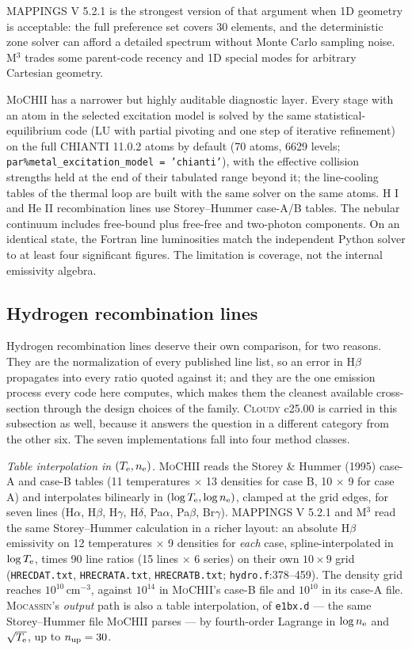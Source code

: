 \documentclass[english,a4paper]{my_memo}
\newcommand{\code}[1]{\texttt{#1}}
\newcommand{\MoCHII}{\textsc{MoCHII}}
\newcommand{\Mthree}{M$^3$}
\newcommand{\Mappings}{MAPPINGS V 5.2.1}
\newcommand{\Mocassin}{\textsc{Mocassin}}
\newcommand{\Cloudy}{\textsc{Cloudy}}
\newcommand{\Te}{T_{\rm e}}
\newcommand{\nelec}{n_{\rm e}}
\begin{document}
\Mappings{} is the strongest version of that argument when 1D geometry is
acceptable: the full preference set covers 30 elements, and the
deterministic zone solver can afford a detailed spectrum without Monte
Carlo sampling noise.  \Mthree{} trades some parent-code recency and 1D
special modes for arbitrary Cartesian geometry.

\MoCHII{} has a narrower but highly auditable diagnostic layer.  Every
stage with an atom in the selected excitation model is solved by the same
statistical-equilibrium code (LU with partial pivoting and one step of
iterative refinement) on the full CHIANTI 11.0.2 atoms by default (70
atoms, 6629 levels; \code{par\%metal\_excitation\_model = 'chianti'}), with
the effective collision strengths held at the end of their tabulated
range beyond it; the line-cooling tables of the thermal loop are built
with the same solver on the same atoms.  H I and He II recombination lines use
Storey--Hummer case-A/B tables.  The nebular continuum includes free-bound
plus free-free and two-photon components.  On an identical state, the
Fortran line luminosities match the independent Python solver to at least
four significant figures.  The limitation is coverage, not the internal
emissivity algebra.

\subsection{Hydrogen recombination lines}
\label{sec:hlines}

Hydrogen recombination lines deserve their own comparison, for two reasons.
They are the normalization of every published line list, so an error in
H$\beta$ propagates into every ratio quoted against it; and they are the one
emission process every code here computes, which makes them the cleanest
available cross-section through the design choices of the family.  \Cloudy{}
c25.00 is carried in this subsection as well, because it answers the question
in a different category from the other six.  The seven implementations fall
into four method classes.

\emph{Table interpolation in $(\Te,\nelec)$.}  \MoCHII{} reads the Storey \&
Hummer (1995) case-A and case-B tables (11 temperatures $\times$ 13 densities
for case B, 10 $\times$ 9 for case A) and interpolates bilinearly in
$(\log \Te, \log \nelec)$, clamped at the grid edges, for seven lines
(H$\alpha$, H$\beta$, H$\gamma$, H$\delta$, Pa$\alpha$, Pa$\beta$,
Br$\gamma$).  \Mappings{} and \Mthree{} read the same Storey--Hummer
calculation in a richer layout: an absolute H$\beta$ emissivity on 12
temperatures $\times$ 9 densities for \emph{each} case, spline-interpolated in
$\log \Te$, times 90 line ratios (15 lines $\times$ 6 series) on their own
$10 \times 9$ grid (\code{HRECDAT.txt}, \code{HRECRATA.txt},
\code{HRECRATB.txt}; \code{hydro.f}:378--459).  The density grid reaches
$10^{10}\,\mathrm{cm^{-3}}$, against $10^{14}$ in \MoCHII{}'s case-B file and
$10^{10}$ in its case-A file.  \Mocassin{}'s \emph{output} path is also a
table interpolation, of \code{e1bx.d} --- the same Storey--Hummer file
\MoCHII{} parses --- by fourth-order Lagrange in $\log \nelec$ and
$\sqrt{\Te}$, up to $n_{\rm up} = 30$.
\end{document}
